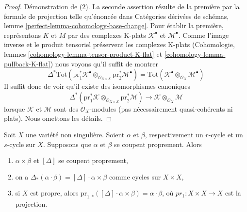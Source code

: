 \begin{proof}
\medskip\noindent
Démonstration de (2). La seconde assertion résulte de la première par la
formule de projection telle qu'énoncée dans
Catégories dérivées de schémas, lemme \ref{perfect-lemma-cohomology-base-change}.
Pour établir la première, représentons $K$ et $M$ par des complexes K-plats
$\mathcal{K}^\bullet$ et $\mathcal{M}^\bullet$.
Comme l'image inverse et le produit tensoriel préservent les complexes K-plats
(Cohomologie, lemmes \ref{cohomology-lemma-tensor-product-K-flat} et
\ref{cohomology-lemma-pullback-K-flat})
nous voyons qu'il suffit de montrer
$$
\Delta^*\text{Tot}(
\text{pr}_1^*\mathcal{K}^\bullet
\otimes_{\mathcal{O}_{X \times X}} \text{pr}_2^*\mathcal{M}^\bullet)
=
\text{Tot}(
\mathcal{K}^\bullet \otimes_{\mathcal{O}_X} \mathcal{M}^\bullet)
$$
Il suffit donc de voir qu'il existe des isomorphismes canoniques
$$
\Delta^*(\text{pr}_1^*\mathcal{K}
\otimes_{\mathcal{O}_{X \times X}} \text{pr}_2^*\mathcal{M})
\longrightarrow
\mathcal{K} \otimes_{\mathcal{O}_X} \mathcal{M}
$$
lorsque $\mathcal{K}$ et $\mathcal{M}$ sont des $\mathcal{O}_X$-modules
(pas nécessairement quasi-cohérents ni plats).
Nous omettons les détails.
\end{proof}

\begin{lemma}
\label{lemma-reduction-diagonal}
Soit $X$ une variété non singulière. Soient $\alpha$ et $\beta$,
respectivement un $r$-cycle et un $s$-cycle sur $X$. Supposons que $\alpha$ et $\beta$
se coupent proprement. Alors
\begin{enumerate}
\item $\alpha \times \beta$ et $[\Delta]$ se coupent proprement,
\item on a $\Delta_*(\alpha \cdot \beta) = [\Delta] \cdot \alpha\times\beta$
comme cycles sur $X \times X$,
\item si $X$ est propre, alors
$\text{pr}_{1, *}([\Delta] \cdot \alpha\times\beta) = \alpha\cdot\beta$,
où $pr_1 : X\times X \to X$ est la projection.
\end{enumerate}
\end{lemma}

